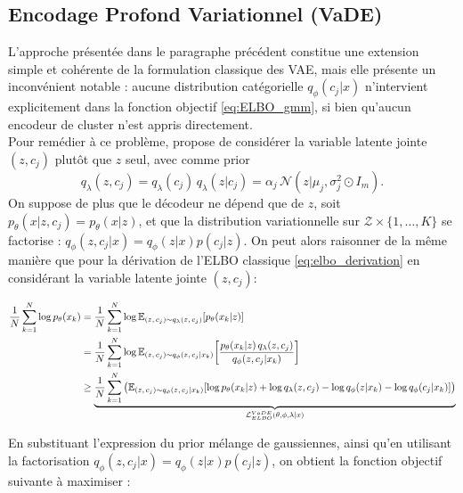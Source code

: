 \documentclass{article}
\begin{document}
        \subsection{Encodage Profond Variationnel (VaDE)}
            
            L'approche présentée dans le paragraphe précédent constitue une extension simple et cohérente de la formulation classique des VAE, mais elle présente un inconvénient notable : aucune distribution catégorielle $q_\phi(c_j | x)$ n'intervient explicitement dans la fonction objectif \eqref{eq:ELBO_gmm}, si bien qu'aucun encodeur de cluster n'est appris directement.\\

            Pour remédier à ce problème, \cite{jiangVariationalDeepEmbedding2017} propose de considérer la variable latente jointe $(z, c_j)$ plutôt que $z$ seul, avec comme prior
            $$
            q_\lambda(z, c_j) = q_\lambda(c_j)\,q_\lambda(z | c_j) = \alpha_j\,\mathcal{N}(z | \mu_j, \sigma_j^2 \odot I_m).
            $$
            On suppose de plus que le décodeur ne dépend que de $z$, soit $p_\theta(x | z, c_j) = p_\theta(x | z)$, et que la distribution variationnelle sur $\mathcal{Z} \times \{1, \dots, K\}$ se factorise : $q_\phi(z, c_j | x) = q_\phi(z | x)p(c_j|z)$. On peut alors raisonner de la même manière que pour la dérivation de l'ELBO classique \eqref{eq:elbo_derivation} en considérant la variable latente jointe $(z,c_j)$:
            
            \begin{align}
                \frac{1}{N}\sum_{k=1}^N \log p_\theta(x_k)
                &= \frac{1}{N}\sum_{k=1}^N \log \mathbb{E}_{(z,\,c_j) \sim q_\lambda(z,\,c_j)}\!\left[p_\theta(x_k | z)\right] \notag \\
                &= \frac{1}{N}\sum_{k=1}^N \log \mathbb{E}_{(z,\,c_j) \sim q_\phi(z,\,c_j|x_k)}\!\left[\frac{p_\theta(x_k|z)\,q_\lambda(z,c_j)}{q_\phi(z,c_j|x_k)}\right] \notag \\
                &\ge \underbrace{\frac{1}{N}\sum_{k=1}^N \left(\mathbb{E}_{(z,\,c_j) \sim q_\phi(z,\,c_j|x_k)}\!\left[\log p_\theta(x_k|z) + \log q_\lambda(z,c_j) - \log q_\phi(z|x_k) - \log q_\phi(c_j|x_k)\right] \right)}_{\mathcal L_{ELBO}^{VaDE}(\theta, \phi, \lambda|x)}
            \end{align}
            
            En substituant l'expression du prior mélange de gaussiennes, ainsi qu'en utilisant la factorisation $q_\phi(z, c_j | x) = q_\phi(z | x) p(c_j|z)$, on obtient la fonction objectif suivante à maximiser :
            
\end{document}
